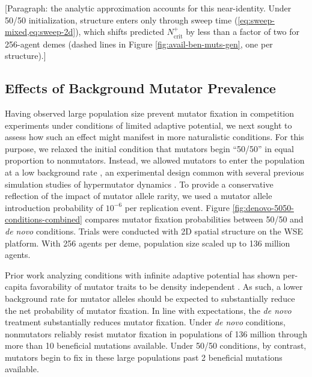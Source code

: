 [Paragraph: the analytic approximation accounts for this near-identity. Under 50/50 initialization, structure enters only through sweep time (\cref{eq:sweep-mixed,eq:sweep-2d}), which shifts predicted $N_\mathrm{crit}^{+}$ by less than a factor of two for 256-agent demes (dashed lines in Figure \ref{fig:avail-ben-muts-gen}, one per structure).]

\subsection{Effects of Background Mutator Prevalence}
\label{sec:background-hypermutator-prevalence}



Having observed large population size prevent mutator fixation in competition experiments under conditions of limited adaptive potential, we next sought to assess how such an effect might manifest in more naturalistic conditions.
For this purpose, we relaxed the initial condition that mutators begin ``50/50'' in equal proportion to nonmutators.
Instead, we allowed mutators to enter the population at a low background rate \citep{desai2011balance,johnson1999approach}, an experimental design common with several previous simulation studies of hypermutator dynamics \citep{wylie2009fixation,tenaillon1999mutators}.
To provide a conservative reflection of the impact of mutator allele rarity, we used a mutator allele introduction probability of $10^{-6}$ per replication event.
Figure \ref{fig:denovo-5050-conditions-combined} compares mutator fixation probabilities between 50/50 and \textit{de novo} conditions.
Trials were conducted with 2D spatial structure on the WSE platform.
With 256 agents per deme, population size scaled up to 136 million agents.

Prior work analyzing conditions with infinite adaptive potential has shown per-capita favorability of mutator traits to be density independent \citep{raynes2019selection}.
As such, a lower background rate for mutator alleles should be expected to substantially reduce the net probability of mutator fixation.
In line with expectations, the \textit{de novo} treatment substantially reduces mutator fixation.
Under \textit{de novo} conditions, nonmutators reliably resist mutator fixation in populations of 136 million through more than 10 beneficial mutations available.
Under 50/50 conditions, by contrast, mutators begin to fix in these large populations past 2 beneficial mutations available.

